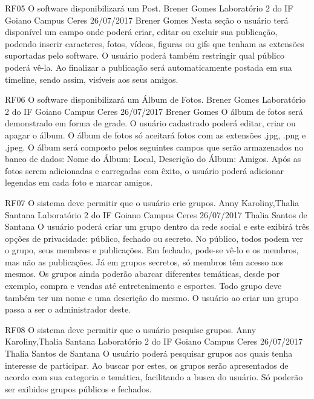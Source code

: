  \requisitoFuncional
 {RF05}
 {O software disponibilizará um Post.}
 {Brener Gomes}
 {Laboratório 2 do IF Goiano Campus Ceres}
 {26/07/2017}
 {Brener Gomes}
 {Nesta seção o usuário terá disponível um campo onde poderá criar, editar ou excluir sua publicação, podendo inserir caracteres, fotos, vídeos, figuras ou gifs que tenham as extensões suportadas pelo software. O usuário poderá também restringir qual público poderá vê-la. Ao finalizar a publicação será automaticamente postada em sua timeline, sendo assim, visíveis aos seus amigos.
 }
 
 \requisitoFuncional
 {RF06}
 {O software disponibilizará um Álbum de Fotos.}
 {Brener Gomes}
 {Laboratório 2 do IF Goiano Campus Ceres}
 {26/07/2017}
 {Brener Gomes}
 {O álbum de fotos será demonstrado em forma de grade. O usuário cadastrado poderá editar, criar ou apagar o álbum. O álbum de fotos só aceitará fotos com as extensões .jpg, .png e .jpeg. O álbum será composto pelos seguintes campos que serão armazenados no banco de dados:
  Nome do Álbum:
  Local,
  Descrição do Álbum:
  Amigos.
  Após as fotos serem adicionadas e carregadas com êxito, o usuário poderá adicionar legendas em cada foto e marcar amigos.
 }
 
 \requisitoFuncional
 {RF07}
 {O sistema deve permitir que o usuário crie grupos.}
 {Anny Karoliny,Thalia Santana}
 {Laboratório 2 do IF Goiano Campus Ceres}
 {26/07/2017}
 {Thalia Santos de Santana}
 {O usuário poderá criar um grupo dentro da rede social e este exibirá três opções de privacidade: público, fechado ou secreto. No público, todos podem ver o grupo, seus membros e publicações. Em fechado, pode-se vê-lo e os membros, mas não as publicações. Já em grupos secretos, só membros têm acesso aos mesmos. Os grupos ainda poderão abarcar diferentes temáticas, desde por exemplo, compra e vendas até entretenimento e esportes. Todo grupo deve também ter um nome e uma descrição do mesmo. O usuário ao criar um grupo passa a ser o administrador deste.
 }
 
 \requisitoFuncional
 {RF08}
 {O sistema deve permitir que o usuário pesquise grupos.}
 {Anny Karoliny,Thalia Santana}
 {Laboratório 2 do IF Goiano Campus Ceres}
 {26/07/2017}
 {Thalia Santos de Santana}
 {O usuário poderá pesquisar grupos aos quais tenha interesse de participar. Ao buscar por estes, os grupos serão apresentados de acordo com sua categoria e temática, facilitando a busca do usuário. Só poderão ser exibidos grupos públicos e fechados.
 }
 
